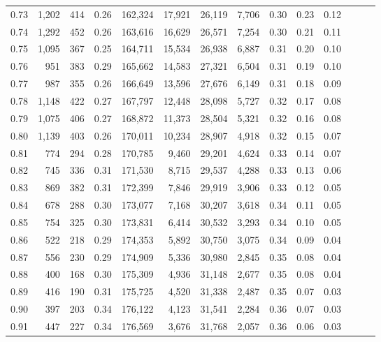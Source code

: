 \begin{tabular}{rrrrrrrrrrrrrr}
0.73 &  1,202 &  414 &  0.26 &  162,324 &   17,921 &  26,119 &   7,706 &  0.30 &  0.23 &      0.12 \\
0.74 &  1,292 &  452 &  0.26 &  163,616 &   16,629 &  26,571 &   7,254 &  0.30 &  0.21 &      0.11 \\
0.75 &  1,095 &  367 &  0.25 &  164,711 &   15,534 &  26,938 &   6,887 &  0.31 &  0.20 &      0.10 \\
0.76 &    951 &  383 &  0.29 &  165,662 &   14,583 &  27,321 &   6,504 &  0.31 &  0.19 &      0.10 \\
0.77 &    987 &  355 &  0.26 &  166,649 &   13,596 &  27,676 &   6,149 &  0.31 &  0.18 &      0.09 \\
0.78 &  1,148 &  422 &  0.27 &  167,797 &   12,448 &  28,098 &   5,727 &  0.32 &  0.17 &      0.08 \\
0.79 &  1,075 &  406 &  0.27 &  168,872 &   11,373 &  28,504 &   5,321 &  0.32 &  0.16 &      0.08 \\
0.80 &  1,139 &  403 &  0.26 &  170,011 &   10,234 &  28,907 &   4,918 &  0.32 &  0.15 &      0.07 \\
0.81 &    774 &  294 &  0.28 &  170,785 &    9,460 &  29,201 &   4,624 &  0.33 &  0.14 &      0.07 \\
0.82 &    745 &  336 &  0.31 &  171,530 &    8,715 &  29,537 &   4,288 &  0.33 &  0.13 &      0.06 \\
0.83 &    869 &  382 &  0.31 &  172,399 &    7,846 &  29,919 &   3,906 &  0.33 &  0.12 &      0.05 \\
0.84 &    678 &  288 &  0.30 &  173,077 &    7,168 &  30,207 &   3,618 &  0.34 &  0.11 &      0.05 \\
0.85 &    754 &  325 &  0.30 &  173,831 &    6,414 &  30,532 &   3,293 &  0.34 &  0.10 &      0.05 \\
0.86 &    522 &  218 &  0.29 &  174,353 &    5,892 &  30,750 &   3,075 &  0.34 &  0.09 &      0.04 \\
0.87 &    556 &  230 &  0.29 &  174,909 &    5,336 &  30,980 &   2,845 &  0.35 &  0.08 &      0.04 \\
0.88 &    400 &  168 &  0.30 &  175,309 &    4,936 &  31,148 &   2,677 &  0.35 &  0.08 &      0.04 \\
0.89 &    416 &  190 &  0.31 &  175,725 &    4,520 &  31,338 &   2,487 &  0.35 &  0.07 &      0.03 \\
0.90 &    397 &  203 &  0.34 &  176,122 &    4,123 &  31,541 &   2,284 &  0.36 &  0.07 &      0.03 \\
0.91 &    447 &  227 &  0.34 &  176,569 &    3,676 &  31,768 &   2,057 &  0.36 &  0.06 &      0.03 \\

\end{tabular}
